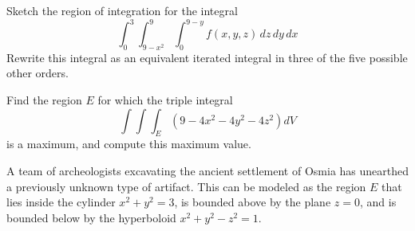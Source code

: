 \documentclass[12pt]{exam}
\begin{document}
\begin{questions}
\question  Sketch the region of integration for the integral
    \[ \int_{0}^{3}\int_{9-x^2}^{9}\int_{0}^{9-y}f(x, y, z) \, dz\, dy\, dx \]
    Rewrite this integral as an equivalent iterated integral in three of the five possible other orders.

\question Find the region $E$ for which the triple integral
    \[ \int\int\int_{E} (9 - 4x^2 - 4y^2 - 4z^2) dV \]
    is a maximum, and compute this maximum value.

\question A team of archeologists excavating the ancient settlement of Osmia has unearthed a previously unknown type of artifact. This can be modeled as the region $E$ that lies inside the cylinder $x^2 +y^2 = 3$, is bounded above by the plane $z = 0$, and is bounded below by the hyperboloid $x^2 + y^2 - z^2 = 1$.
\end{questions}
\end{document}
